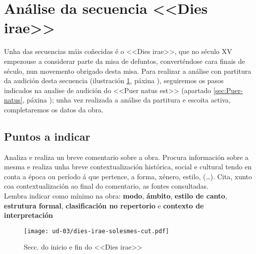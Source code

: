 %
%
\section{Análise da secuencia <<Dies irae>>} \label{sec:Dies-irae}
%
\noindent
Unha das secuencias máis coñecidas é o <<Dies irae>>, que no século 
{\small XV} empezouse a considerar parte da misa de defuntos, converténdose 
cara finais de século, nun movemento obrigado desta misa.
Para realizar a análise con partitura da audición desta secuencia 
(ilustración \ref{fig:dies-irae}, páxina \pageref{fig:dies-irae}), seguiremos 
os pasos indicados na analise de audición do <<Puer natus est>>  
(apartado \ref{sec:Puer-natus}, páxina \pageref{sec:Puer-natus}); unha vez 
realizada a análise da partitura e escoita activa, completaremos os datos da 
obra.
%
\subsection*{Puntos a indicar} \label{subsec:puntos}
%
\noindent
Analiza e realiza un breve comentario sobre a obra. Procura información sobre a 
mesma e realiza unha breve contextualización histórica, social e cultural tendo 
en conta a época ou período á que pertence, a forma, xénero, estilo, (\ldots). 
Cita, xunto coa contextualización ao final do comentario, as 
fontes consultadas. \\
%
\noindent
Lembra indicar como mínimo na obra: \textbf{modo}, \textbf{ámbito}, 
\textbf{estilo de canto}, \textbf{estrutura formal}, \textbf{clasificación no 
repertorio} e \textbf{contexto de interpretación}
%
\vspace*{0.5cm}
%

\begin{ejercicio}



\vspace*{13.5cm}
\end{ejercicio}

%
\newpage
\begin{figure}[H]
    \centering
    \texttt{[image: ud-03/dies-irae-solesmes-cut.pdf]}
    \caption{Secc. do inicio e fin do <<Dies irae>>}
    \label{fig:dies-irae}
\end{figure}
%
\newpage

